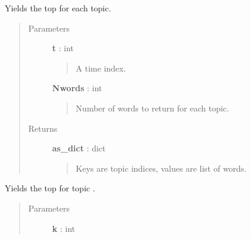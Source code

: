 \documentclass[letterpaper,10pt,english]{sphinxmanual}
\begin{document}
\begin{fulllineitems}
\begin{fulllineitems}
\end{fulllineitems}


\begin{fulllineitems}
\label{tethne.model.corpus.dtmmodel:tethne.model.corpus.dtmmodel.DTMModel.list_topic_diachronic}
\end{fulllineitems}


\begin{fulllineitems}
\label{tethne.model.corpus.dtmmodel:tethne.model.corpus.dtmmodel.DTMModel.list_topics}
Yields the top  for each topic.
\begin{quote}\begin{description}
\item[{Parameters}] \leavevmode
\textbf{t} : int
\begin{quote}

A time index.
\end{quote}

\textbf{Nwords} : int
\begin{quote}

Number of words to return for each topic.
\end{quote}

\item[{Returns}] \leavevmode
\textbf{as\_dict} : dict
\begin{quote}

Keys are topic indices, values are list of words.
\end{quote}

\end{description}\end{quote}

\end{fulllineitems}


\begin{fulllineitems}
\label{tethne.model.corpus.dtmmodel:tethne.model.corpus.dtmmodel.DTMModel.print_topic}
Yields the top  for topic .
\begin{quote}\begin{description}
\item[{Parameters}] \leavevmode
\textbf{k} : int
\begin{quote}


\end{quote}
\end{description}
\end{quote}
\end{fulllineitems}
\end{fulllineitems}
\end{document}
